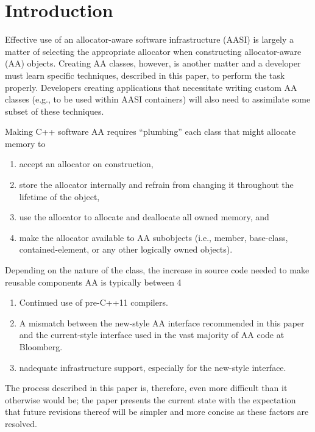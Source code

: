 \section{Introduction}

Effective use of an allocator-aware software infrastructure (AASI) is largely
a matter of selecting the appropriate allocator when constructing
allocator-aware (AA) objects.  Creating AA classes, however, is another matter
and a developer must learn specific techniques, described in this paper, to
perform the task properly. Developers creating applications that necessitate
writing custom AA classes (e.g., to be used within AASI containers) will also
need to assimilate some subset of these techniques.

Making C++ software AA requires “plumbing” each class that might allocate memory to
\begin{enumerate}
\item accept an allocator on construction,
\item store the allocator internally and refrain from changing it throughout
  the lifetime of the object,
\item use the allocator to allocate and deallocate all owned memory, and
\item make the allocator available to AA subobjects (i.e., member, base-class,
  contained-element, or any other logically owned objects).
\end{enumerate}

Depending on the nature of the class, the increase in source code needed to make reusable components AA is typically between 4%
\begin{enumerate}
\item Continued use of pre-C++11 compilers.
\item A mismatch between the new-style AA interface recommended in this
  paper and the current-style interface used in the vast majority of AA
  code at Bloomberg.
\item nadequate infrastructure support, especially for the new-style interface.
\end{enumerate}

The process described in this paper is, therefore, even more difficult than
it otherwise would be; the paper presents the current state with the expectation
that future revisions thereof will be simpler and more concise as these factors
are resolved.

